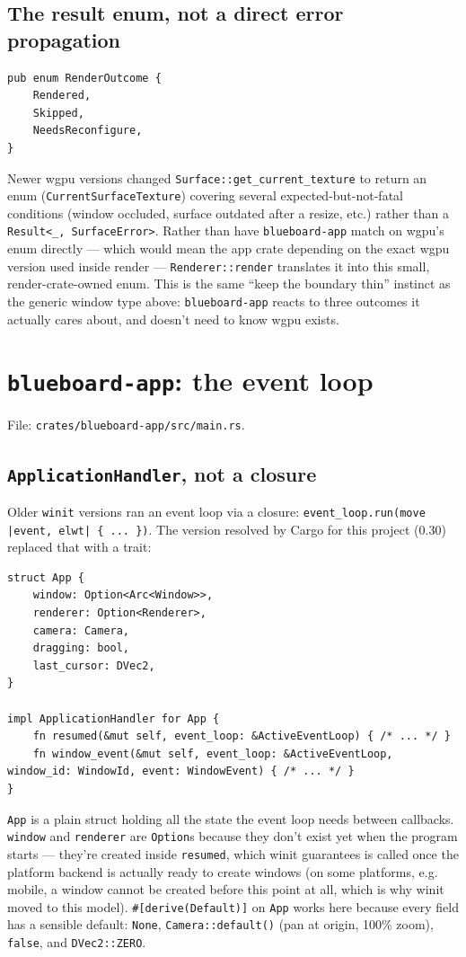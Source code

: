 \documentclass[11pt]{article}
\begin{document}
\subsection{The result enum, not a direct error propagation}
\begin{lstlisting}
pub enum RenderOutcome {
    Rendered,
    Skipped,
    NeedsReconfigure,
}
\end{lstlisting}
Newer wgpu versions changed \texttt{Surface::get\_current\_texture} to return an enum
(\texttt{CurrentSurfaceTexture}) covering several expected-but-not-fatal conditions
(window occluded, surface outdated after a resize, etc.) rather than a
\texttt{Result<\_, SurfaceError>}. Rather than have \texttt{blueboard-app} match on wgpu's
enum directly — which would mean the app crate depending on the exact wgpu version used
inside render — \texttt{Renderer::render} translates it into this small,
render-crate-owned enum. This is the same ``keep the boundary thin'' instinct as the
generic window type above: \texttt{blueboard-app} reacts to three outcomes it actually
cares about, and doesn't need to know wgpu exists.

\section{\texttt{blueboard-app}: the event loop}

File: \texttt{crates/blueboard-app/src/main.rs}.

\subsection{\texttt{ApplicationHandler}, not a closure}
Older \texttt{winit} versions ran an event loop via a closure:
\texttt{event\_loop.run(move |event, elwt| \{ ... \})}. The version resolved by Cargo for
this project (0.30) replaced that with a trait:
\begin{lstlisting}
struct App {
    window: Option<Arc<Window>>,
    renderer: Option<Renderer>,
    camera: Camera,
    dragging: bool,
    last_cursor: DVec2,
}

impl ApplicationHandler for App {
    fn resumed(&mut self, event_loop: &ActiveEventLoop) { /* ... */ }
    fn window_event(&mut self, event_loop: &ActiveEventLoop, window_id: WindowId, event: WindowEvent) { /* ... */ }
}
\end{lstlisting}
\texttt{App} is a plain struct holding all the state the event loop needs between
callbacks. \texttt{window} and \texttt{renderer} are \texttt{Option}s because they don't
exist yet when the program starts — they're created inside \texttt{resumed}, which winit
guarantees is called once the platform backend is actually ready to create windows (on some
platforms, e.g. mobile, a window cannot be created before this point at all, which is why
winit moved to this model). \texttt{\#[derive(Default)]} on \texttt{App} works here because
every field has a sensible default: \texttt{None}, \texttt{Camera::default()} (pan at
origin, 100\% zoom), \texttt{false}, and \texttt{DVec2::ZERO}.
\end{document}
